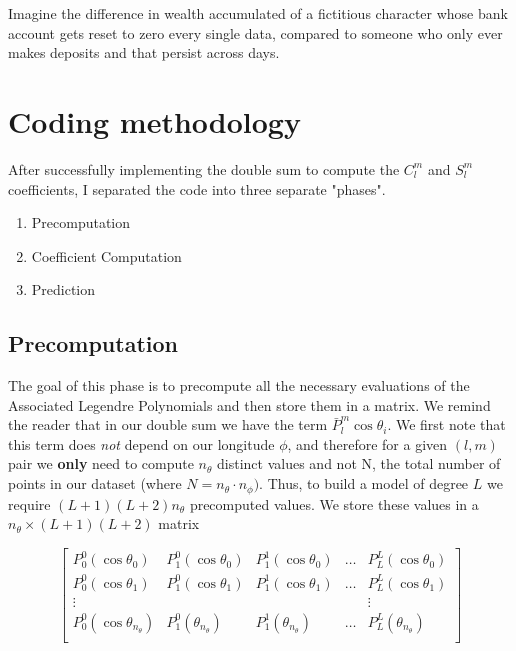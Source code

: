 \documentclass[a4paper]{article}
\theoremstyle{definition}
\begin{document}
    Imagine the difference in wealth accumulated of a fictitious character whose bank account gets reset to zero every single data, compared to someone who only ever makes
deposits and that persist across days.
\section{Coding methodology}

After successfully implementing the double sum to compute the $C_l^m$ and $S_l^m$ coefficients, I separated the code into three separate
"phases".

\begin{enumerate}
    \item Precomputation
    \item Coefficient Computation
    \item Prediction
\end{enumerate}

\subsection{Precomputation}

The goal of this phase is to precompute all the necessary evaluations of the Associated Legendre Polynomials and then store them in 
a matrix. We remind the reader that in our double sum we have the term $\bar P_l^m\cos \theta_i$. We first note that this term does \textit{not}
depend on our longitude $\phi$, and therefore for a given $(l, m)$ pair we \textbf{only} need to compute $n_\theta$ distinct values and not
N, the total number of points in our dataset (where $N = n_\theta \cdot n_\phi)$. Thus, to build a model of degree $L$ we require 
$(L + 1)(L + 2)n_\theta$ precomputed values. We store these values in a $n_\theta \times (L + 1)(L + 2)$ matrix

\begin{equation}
    \begin{bmatrix}
        P_0^0(\cos\theta_0) & P_1^0(\cos\theta_0) & P_1^1(\cos\theta_0) & \dots & P_L^L(\cos\theta_0) \\
        P_0^0(\cos\theta_1) & P_1^0(\cos\theta_1) & P_1^1(\cos\theta_1) & \dots & P_L^L(\cos\theta_1) \\
        \vdots & & & & \vdots \\
        P_0^0(\cos\theta_{n_\theta}) & P_1^0(\theta_{n_\theta}) & P_1^1(\theta_{n_\theta}) & \dots & P_L^L(\theta_{n_\theta}) \\
    \end{bmatrix}
\end{equation}
\end{document}
